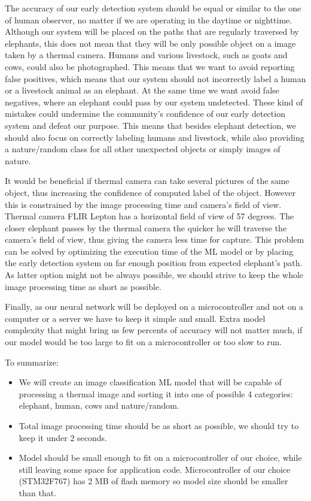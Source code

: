 The accuracy of our early detection system should be equal or similar to the one of human observer, no matter if we are operating in the daytime or nighttime.
Although our system will be placed on the paths that are regularly traversed by elephants, this does not mean that they will be only possible object on a image taken by a thermal camera.
Humans and various livestock, such as goats and cows, could also be photographed.
This means that we want to avoid reporting false positives, which means that our system should not incorrectly label a human or a livestock animal as an elephant.
At the same time we want avoid false negatives, where an elephant could pass by our system undetected.
These kind of mistakes could undermine the community's confidence of our early detection system and defeat our purpose.
This means that besides elephant detection, we should also focus on correctly labeling humans and livestock, while also providing a nature/random class for all other unexpected objects or simply images of nature.

It would be beneficial if thermal camera can take several pictures of the same object, thus increasing the confidence of computed label of the object.
However this is constrained by the image processing time and camera's field of view.
Thermal camera FLIR Lepton has a horizontal field of view of 57 degrees.
The closer elephant passes by the thermal camera the quicker he will traverse the camera's field of view, thus giving the camera less time for capture.
This problem can be solved by optimizing the execution time of the ML model or by placing the early detection system on far enough position from expected elephant's path.
As latter option might not be always possible, we should strive to keep the whole image processing time as short as possible.

Finally, as our neural network will be deployed on a microcontroller and not on a computer or a server we have to keep it simple and small.
Extra model complexity that might bring us few percents of accuracy will not matter much, if our model would be too large to fit on a microcontroller or too slow to run.


To summarize:
\begin{itemize}
    \item We will create an image classification ML model that will be capable of processing a thermal image and sorting it into one of possible 4 categories: elephant, human, cows and nature/random.
    \item Total image processing time should be as short as possible, we should try to keep it under 2 seconds.
    \item Model should be small enough to fit on a microcontroller of our choice, while still leaving some space for application code. Microcontroller of our choice (STM32F767) has 2 MB of flash memory so model size should be smaller than that.
\end{itemize}


